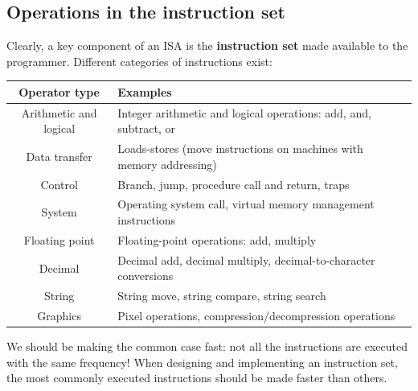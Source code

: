 \documentclass[a4paper,11pt]{article}
\begin{document}
\subsection{Operations in the instruction set}

Clearly, a key component of an ISA is the \textbf{instruction set} made available to the programmer. 
Different categories of instructions exist:

\begin{table}[H]
	\center {}
	\begin{tabular}{c | p{10cm}}
\hline
\textbf{Operator type} & \textbf{Examples} \\
\hline
Arithmetic and logical & Integer arithmetic and logical operations: add, and, subtract, or \\
\hline
Data transfer & Loads-stores (move instructions on machines with memory addressing) \\
\hline
Control & Branch, jump, procedure call and return, traps \\
\hline
System & Operating system call, virtual memory management instructions \\
\hline
Floating point & Floating-point operations: add, multiply \\
\hline
Decimal & Decimal add, decimal multiply, decimal-to-character conversions \\
\hline
String & String move, string compare, string search \\
\hline
Graphics & Pixel operations, compression/decompression operations \\
\hline
\end{tabular}
\end{table}

We should be making the common case fast: not all the instructions are executed with the same frequency!
When designing and implementing an instruction set, the most commonly executed instructions should be made faster than others.
\end{document}

